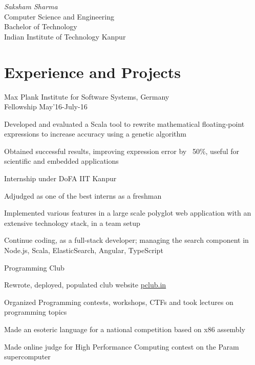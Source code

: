 \documentclass{tccv}
\begin{document}
{ \textit{Saksham \textcolor{myred}{Sharma}}}
\medskip\\
\large{Computer Science and Engineering}\\
\large{Bachelor of Technology}\\
{Indian Institute of Technology Kanpur}

\vspace{-0.4cm}
\section{Experience and Projects}
\vspace{-0.1cm}
\begin{experience}

  {Max Plank Institute for Software Systems, \small{Germany}\\
  Fellowship \hfill May'16-July-16}
  {
  \item Developed and evaluated a Scala tool to rewrite
    mathematical floating-point expressions to increase accuracy using a genetic
    algorithm
  \item Obtained successful results, improving expression error by
    ~50\%, useful for scientific and embedded applications
  }

  {Internship under DoFA IIT Kanpur}
  {
  \item Adjudged as one of the best interns as a freshman
  \item Implemented various features in a large scale polyglot web
    application with an extensive technology stack, in a team setup
  \item Continue coding, as a full-stack developer;
    managing the search component in Node.js, Scala, ElasticSearch,
    Angular, TypeScript
  }

  {Programming Club}
  {
  \item Rewrote, deployed, populated club website \href{http://pclub.in}{pclub.in}
  \item Organized Programming contests, workshops, CTFs and took
    lectures on programming topics
  }

  {
  \item Made an esoteric language for a national
    competition based on x86 assembly
  \item Made online judge for High Performance Computing contest
    on the Param supercomputer
  }


\end{experience}
\end{document}
